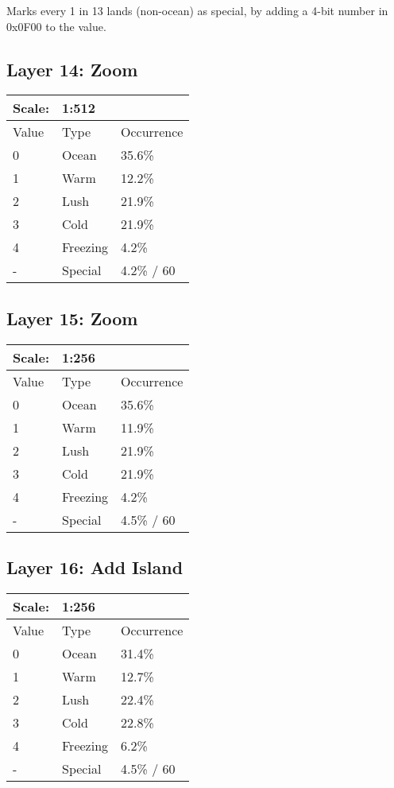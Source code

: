 \documentclass{article}
\begin{document}
	\medskip\noindent
	Marks every 1 in 13 lands (non-ocean) as special, by adding a 4-bit number in 0x0F00 to the value.
	
	
	\subsection{Layer 14: Zoom}
	\begin{tabular}{|l|l|l|}\hline
		Scale: & \multicolumn{2}{|l|}{1:512} \\\hline\hline
		Value  & Type   & Occurrence \\\hline
		0      & Ocean    & 35.6\%\\\hline
		1      & Warm     & 12.2\%\\\hline
		2      & Lush     & 21.9\%\\\hline
		3      & Cold     & 21.9\%\\\hline
		4      & Freezing & 4.2\%\\\hline
		-      & Special  & 4.2\% / 60\\\hline
	\end{tabular}

	\subsection{Layer 15: Zoom}
	\begin{tabular}{|l|l|l|}\hline
		Scale: & \multicolumn{2}{|l|}{1:256} \\\hline\hline
		Value  & Type   & Occurrence \\\hline
		0      & Ocean    & 35.6\%\\\hline
		1      & Warm     & 11.9\%\\\hline
		2      & Lush     & 21.9\%\\\hline
		3      & Cold     & 21.9\%\\\hline
		4      & Freezing & 4.2\%\\\hline
		-      & Special  & 4.5\% / 60\\\hline
	\end{tabular}
	
	\subsection{Layer 16: Add Island}
	\begin{tabular}{|l|l|l|}\hline
		Scale: & \multicolumn{2}{|l|}{1:256} \\\hline\hline
		Value  & Type   & Occurrence \\\hline
		0      & Ocean    & 31.4\%\\\hline
		1      & Warm     & 12.7\%\\\hline
		2      & Lush     & 22.4\%\\\hline
		3      & Cold     & 22.8\%\\\hline
		4      & Freezing & 6.2\%\\\hline
		-      & Special  & 4.5\% / 60\\\hline
	\end{tabular}
	
\end{document}
